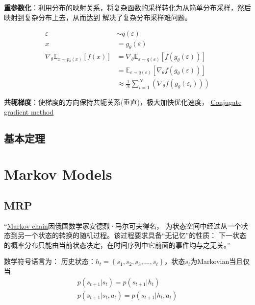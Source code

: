\documentclass[UTF8]{ctexart}
\begin{document}
\textbf{重参数化}：利用分布的映射关系，将复杂函数的采样转化为从简单分布采样，然后映射到复杂分布上去，从而达到
解决了复杂分布采样难问题。

\[
\begin{aligned}
\varepsilon & \sim q(\varepsilon) \\
x &=g_{\theta}(\varepsilon) \\
\nabla_{\theta} \mathbb{E}_{x \sim p_{\theta}(x)}[f(x)] &=\nabla_{\theta} \mathbb{E}_{\varepsilon \sim q(\varepsilon)}\left[f\left(g_{\theta}(\varepsilon)\right)\right] \\
&=\mathbb{E}_{\varepsilon \sim q(\varepsilon)}\left[\nabla_{\theta} f\left(g_{\theta}(\varepsilon)\right)\right] \\
& \approx \frac{1}{N} \sum_{i=1}^{N}\left(\nabla_{\theta} f\left(g_{\theta}\left(\varepsilon_{i}\right)\right)\right)
\end{aligned}
\]


\textbf{共轭梯度}：使梯度的方向保持共轭关系(垂直)，极大加快优化速度，
\href{https://en.wikipedia.org/wiki/Conjugate_gradient_method}{Conjugate gradient method}


\subsection{基本定理}

\section{Markov Models}
\subsection{MRP}
“\href{https://en.wikipedia.org/wiki/Markov_chain}{Markov chain}因俄国数学家安德烈·马尔可夫得名，
为状态空间中经过从一个状态到另一个状态的转换的随机过程。该过程要求具备“无记忆”的性质：
下一状态的概率分布只能由当前状态决定，在时间序列中它前面的事件均与之无关。”

数学符号语言为：
历史状态：$h_{t}=\left\{s_{1}, s_{2}, s_{3}, \ldots, s_{t}\right\}$，状态$s_t$为Markovian当且仅当
\[ \begin{array}{c}
    p\left(s_{t+1} | s_{t}\right)=p\left(s_{t+1} | h_{t}\right) \\
    p\left(s_{t+1} | s_{t}, a_{t}\right)=p\left(s_{t+1} | h_{t}, a_{t}\right)
    \end{array}
\]

\end{document}
